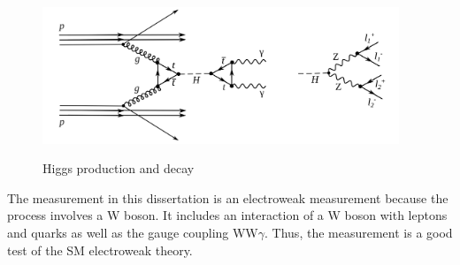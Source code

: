 \begin{figure}[htb]
  \begin{center}
    {\includegraphics[width=0.95\textwidth]{../figs/Intro/FeynmanHiggs.png}}
    \caption{Higgs production and decay}
    \label{fig:higgsProduction}
  \end{center}
\end{figure}

The measurement in this dissertation is an electroweak measurement because the process involves a W boson. It includes an interaction of a W boson with leptons and quarks as well as the gauge coupling WW$\gamma$. Thus, the measurement is a good test of the SM electroweak theory.\\ 



